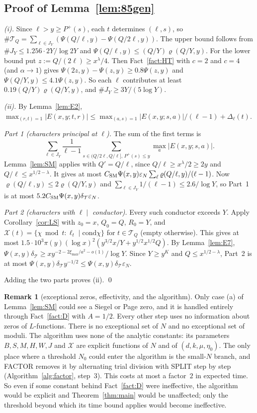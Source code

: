 \documentclass[11pt]{amsart}
\theoremstyle{definition}
\newtheorem{remark}[theorem]{Remark}
\newcommand{\cT}{\mathcal{T}}
\newcommand{\cX}{\mathcal{X}}
\newcommand{\Pp}{P^{+}}
\begin{document}
\subsection{Proof of Lemma~\ref{lem:85gen}}

\emph{(i).} Since $\ell>y\ge\Pp(s)$, each $t$ determines $(\ell,s)$, so $\#\cT_Q=\sum_{\ell\in J_Y}(\Psi(Q/\ell,y)-\Psi(Q/2\ell,y))$. The upper
bound follows from $\#J_Y\le1.256\cdot2Y/\log2Y$ and $\Psi(Q/\ell,y)\le(Q/Y)\varrho(Q/Y,y)$. For the lower bound put $z:=Q/(2\ell)\ge x^\lambda/4$. Then
Fact~\ref{fact:HT} with $c=2$ and $c=4$ (and $\alpha\to1$) gives $\Psi(2z,y)-\Psi(z,y)\ge0.8\Psi(z,y)$ and $\Psi(Q/Y,y)\le4.1\Psi(z,y)$. So each
$\ell$ contributes at least $0.19(Q/Y)\varrho(Q/Y,y)$, and $\#J_Y\ge3Y/(5\log Y)$.

\emph{(ii).} By Lemma~\ref{lem:E2}, $\max_{(r,t)=1}|E(x,y;t,r)|\le\max_{(a,s)=1}|E(x,y;s,a)|/(\ell-1)+\Delta_\ell(t)$.

\emph{Part 1 (characters principal at $\ell$).} The sum of the first terms is
\[
\sum_{\ell\in J_Y}\frac1{\ell-1}\sum_{s\in(Q/2\ell,Q/\ell],\,\Pp(s)\le y}\max_a|E(x,y;s,a)|.
\]
Lemma~\ref{lem:SM} applies with $Q'=Q/\ell$, since $Q/\ell\ge x^\lambda/2\ge2y$ and $Q/\ell\le x^{1/2-\lambda}$. It gives at most
$C_{\rm SM}\Psi(x,y)\varepsilon_N\sum_\ell\varrho(Q/\ell,y)/(\ell-1)$. Now $\varrho(Q/\ell,y)\le2\varrho(Q/Y,y)$ and $\sum_{\ell\in J_Y}1/(\ell-1)\le2.6/\log Y$, so Part~1
is at most $5.2C_{\rm SM}\Psi(x,y)\delta_\cT\varepsilon_N$.

\emph{Part 2 (characters with $\ell\mid$ conductor).} Every such conductor exceeds $Y$. Apply Corollary~\ref{cor:LS} with $z_0=x$, $Q_0=Q$,
$R_0=Y$, and $\mathcal X(t)=\{\chi\bmod t:\ell_t\mid\mathrm{cond}\chi\}$ for $t\in\cT_Q$ (empty otherwise). This gives at most
$1.5\cdot10^3\pi(y)(\log x)^2(y^{3/2}x/Y+y^{1/2}x^{1/2}Q)$. By Lemma~\ref{lem:E7}, $\Psi(x,y)\delta_\cT\ge xy^{-2-2\xi_{\max}/a^2-o(1)}/\log Y$. Since
$Y\ge y^K$ and $Q\le x^{1/2-\lambda}$, Part~2 is at most $\Psi(x,y)\delta_\cT y^{-1/2}\le\Psi(x,y)\delta_\cT\varepsilon_N$.

Adding the two parts proves (ii). \qed

\begin{remark}[exceptional zeros, effectivity, and the algorithm]\label{rem:noN0}
Only case (a) of Lemma~\ref{lem:SM} could see a Siegel or Page zero, and it is handled entirely through Fact~\ref{fact:D} with $A=1/2$. Every
other step uses no information about zeros of $L$-functions. There is no exceptional set of $N$ and no exceptional set of moduli. The
algorithm uses none of the analytic constants: its parameters $B,S,M,H,W,J$ and $\cX$ are explicit functions of $N$ and of $(d,k,\mu,\eta_0)$. The only
place where a threshold $N_0$ could enter the algorithm is the small-$N$ branch, and FACTOR removes it by alternating trial division with SPLIT
step by step (Algorithm~\ref{alg:factor}, step~3). This costs at most a factor~$2$ in expected time. So even if some constant behind
Fact~\ref{fact:D} were ineffective, the algorithm would be explicit and Theorem~\ref{thm:main} would be unaffected; only the threshold beyond
which its time bound applies would become ineffective.
\end{remark}




\end{document}
